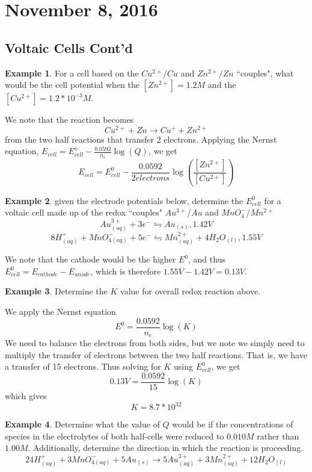 \documentclass[11pt]{article}
\theoremstyle{plain} %
\theoremstyle{definition}
\theoremstyle{example}
\newtheorem*{example}{Example}
\theoremstyle{remark}
\begin{document}
\section{November 8, 2016}
\subsection{Voltaic Cells Cont'd}

\begin{example}
For a cell based on the $Cu^{2+}/Cu$ and $Zn^{2+}/Zn$ ``couples", what would be the cell potential when the $\left[Zn^{2+}\right] = 1.2M$ and the $\left[Cu^{2+}\right] = 1.2*10^{-3}M$.
\end{example}

We note that the reaction becomes $$Cu^{2+} + Zn \rightarrow Cu^+ + Zn^{2+}$$ from the two half reactions that transfer 2 electrons. Applying the Nernst equation, $E_{cell} = E_{cell}^o - \frac{0.0592}{n_e}\log(Q)$, we get $$E_{cell} = E_{cell}^0-\frac{0.0592}{2 electrons}\log\left(\frac{\left[Zn^{2+}\right]}{\left[Cu^{2+}\right]}\right)$$

\begin{example}
given the electrode potentials below, determine the $E_{cell}^0$ for a voltaic cell made up of the redox ``couples" $Au^{3+}/Au$ and $MnO_4^-/Mn^{2+}$ 
$$Au_{(aq)}^{3+} + 3e^- \leftrightharpoons Au_{(s)}, 1.42V$$
$$8H_{(aq)}^+ +MnO_{4(aq)}^- + 5e^-\leftrightharpoons Mn_{(aq)}^{2+} + 4H_2O_{(l)}, 1.55V$$
\end{example}

We note that the cathode would be the higher $E^0$, and thus $E_{cell}^0 = E_{cathode} - E_{anode}$, which is therefore $1.55V - 1.42V = 0.13 V$.

\begin{example}
Determine the $K$ value for overall redox reaction above.
\end{example}

We apply the Nernst equation $$E^0= \frac{0.0592}{n_e}\log(K)$$ We need to balance the electrons from both sides, but we note we simply need to multiply the transfer of electrons between the two half reactions. That is, we have a transfer of 15 electrons. Thus solving for $K$ using $E_{cell}^0$, we get $$0.13V = \frac{0.0592}{15}\log(K)$$ which gives $$K = 8.7 * 10^{32}$$

\begin{example}
Determine what the value of $Q$ would be if the concentrations of species in the electrolytes of both half-cells were reduced to $0.010M$ rather than $1.00M$. Additionally, determine the direction in which the reaction is proceeding. 
$$24H_{(aq)}^+ + 3MnO_{4(aq)}^- + 5Au_{(s)} \rightarrow 5Au_{(aq)}^{3+} + 3Mn_{(aq)}^{2+} + 12H_2O_{(l)}$$
\end{example}
\end{document}
